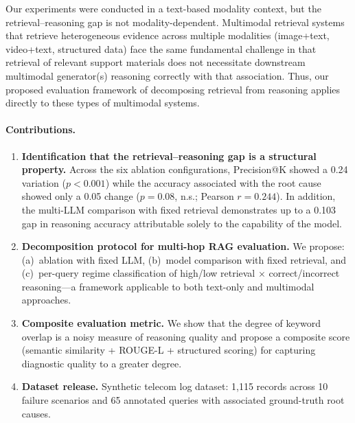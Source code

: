 \documentclass[11pt,a4paper]{article}
\begin{document}
Our experiments were conducted in a text-based modality context, but
the retrieval--reasoning gap is not modality-dependent.
Multimodal retrieval systems that retrieve heterogeneous evidence
across multiple modalities (image+text, video+text, structured data)
face the same fundamental challenge in that retrieval of relevant
support materials does not necessitate downstream multimodal
generator(s) reasoning correctly with that association.
Thus, our proposed evaluation framework of decomposing retrieval
from reasoning applies directly to these types of multimodal systems.

\paragraph{Contributions.}
\begin{enumerate}[nosep]
    \item \textbf{Identification that the retrieval--reasoning gap is
    a structural property.}
    Across the six ablation configurations, Precision@K showed a 0.24
    variation ($p{<}0.001$) while the accuracy associated with the
    root cause showed only a 0.05 change ($p{=}0.08$, n.s.;
    Pearson $r{=}0.244$).
    In addition, the multi-LLM comparison with fixed retrieval
    demonstrates up to a 0.103 gap in reasoning accuracy attributable
    solely to the capability of the model.
    \item \textbf{Decomposition protocol for multi-hop RAG evaluation.}
    We propose: (a)~ablation with fixed LLM, (b)~model comparison
    with fixed retrieval, and (c)~per-query regime classification of
    high/low retrieval $\times$ correct/incorrect reasoning---a
    framework applicable to both text-only and multimodal approaches.
    \item \textbf{Composite evaluation metric.}
    We show that the degree of keyword overlap is a noisy measure of
    reasoning quality and propose a composite score (semantic
    similarity + ROUGE-L + structured scoring) for capturing
    diagnostic quality to a greater degree.
    \item \textbf{Dataset release.}
    Synthetic telecom log dataset: 1{,}115 records across 10 failure
    scenarios and 65 annotated queries with associated ground-truth
    root causes.
\end{enumerate}

\end{document}
